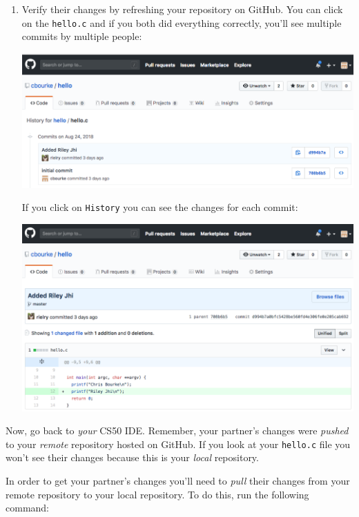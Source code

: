 \documentclass[12pt]{scrartcl}
\begin{document}
\begin{enumerate}
  \item Verify their changes by refreshing your repository on
  GitHub.  You can click on the \texttt{hello.c} and if 
  you both did everything correctly, you'll see multiple commits 
  by multiple people:
  \begin{center}
  \includegraphics[scale=0.25]{./hack1.0-files/completedRepo02.png}
  \end{center}
  If you click on \texttt{History} you can see the changes for
  each commit: 
  \begin{center}
  \includegraphics[scale=0.25]{./hack1.0-files/completedRepo03.png}
  \end{center}

\end{enumerate}

Now, go back to \emph{your} CS50 IDE.  Remember, your partner's
changes were \emph{pushed} to your \emph{remote} repository hosted
on GitHub.  If you look at your \texttt{hello.c} file
you won't see their changes because this is your \emph{local}
repository.  

In order to get your partner's changes you'll need to \emph{pull}
their changes from your remote repository to your local repository.
To do this, run the following command:
\end{document}
